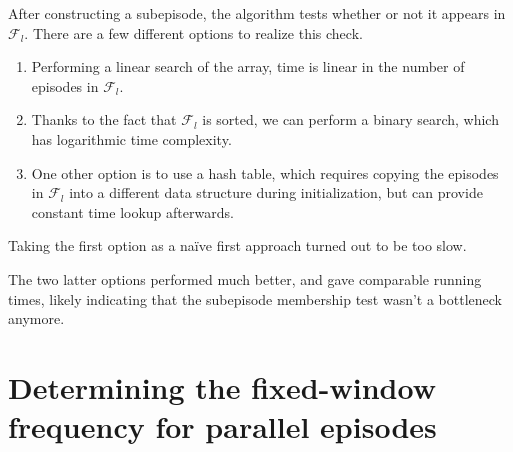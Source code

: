 After constructing a subepisode, the algorithm tests whether or not it appears in $ \mathcal{F}_l $. There are a few different options to realize this check.

\begin{enumerate}
\item Performing a linear search of the array, time is linear in the number of episodes in $ \mathcal{F}_l $.
\item Thanks to the fact that $ \mathcal{F}_l $ is sorted, we can perform a binary search, which has logarithmic time complexity.
\item One other option is to use a hash table, which requires copying the episodes in $ \mathcal{F}_l $ into a different data structure during initialization, but can provide constant time lookup afterwards.
\end{enumerate}

Taking the first option as a naïve first approach turned out to be too slow.

The two latter options performed much better, and gave comparable running times, likely indicating that the subepisode membership test wasn't a bottleneck anymore.


\section{Determining the fixed-window frequency for parallel episodes}
\label{sec:rec-par-fwi}

